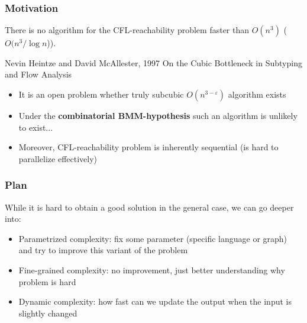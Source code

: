 \documentclass{beamer}
\begin{document}
\begin{frame}
\frametitle{Motivation}
There is no algorithm for the CFL-reachability problem faster than $O(n^3)$ ($O(n^3/\log n$)). 
\begin{block}{Nevin Heintze and David McAllester, 1997}
On the Cubic Bottleneck in Subtyping and Flow Analysis
\end{block}

\begin{itemize}
\item It is an open problem whether truly subcubic $O(n^{3-\varepsilon})$ algorithm exists
\item Under the \textbf{combinatorial BMM-hypothesis} such an algorithm is unlikely to exist...
\item Moreover, CFL-reachability problem is inherently sequential (is hard to parallelize effectively)
\end{itemize}
\end{frame}

\begin{frame}
\frametitle{Plan}
While it is hard to obtain a good solution in the general case, we can go deeper into:
\begin{itemize}
\item Parametrized complexity: fix some parameter (specific language or graph) and try to improve this variant of the problem
\item Fine-grained complexity: no improvement, just better understanding why problem is hard
\item Dynamic complexity: how fast can we update the output when the input is slightly changed
\end{itemize}
\end{frame}
\end{document}
